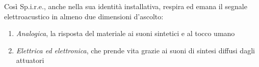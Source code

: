 Così Sp.i.r.e., anche nella sua identità installativa, respira ed emana il segnale elettroacustico in almeno due dimensioni d'ascolto:

\begin{enumerate} 
\item{\textit{Analogica}, la risposta del materiale ai suoni sintetici e al tocco umano}
\item{\textit{Elettrica ed elettronica}, che prende vita grazie ai suoni di sintesi diffusi dagli attuatori}
\end{enumerate}

